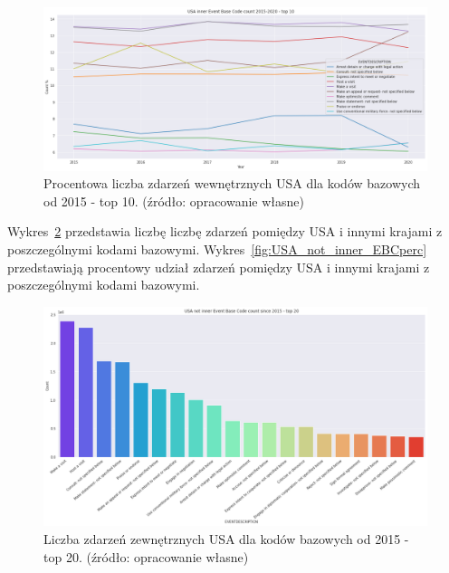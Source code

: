 \documentclass[11pt]{report}
\begin{document}
    \begin{figure}[!htp]
        \centering
        \includegraphics[width=\linewidth]{fig/USA inner/EBCperc.png}
        \caption{Procentowa liczba zdarzeń wewnętrznych USA dla kodów bazowych od 2015 - top 10. (źródło: opracowanie własne)}
        \label{fig:USA_inner_EBCperc}
    \end{figure}

    Wykres~\ref{fig:USA_not_inner_EBC} przedstawia liczbę liczbę zdarzeń pomiędzy USA i innymi krajami z poszczególnymi kodami bazowymi.
    Wykres~\ref{fig:USA_not_inner_EBCperc} przedstawiają procentowy udział zdarzeń pomiędzy USA i innymi krajami z poszczególnymi kodami bazowymi.

    \begin{figure}[!htp]
        \centering
        \includegraphics[width=\linewidth]{fig/USA not inner/EBC.png}
        \caption{Liczba zdarzeń zewnętrznych USA dla kodów bazowych od 2015 - top 20. (źródło: opracowanie własne)}
        \label{fig:USA_not_inner_EBC}
    \end{figure}
\end{document}
